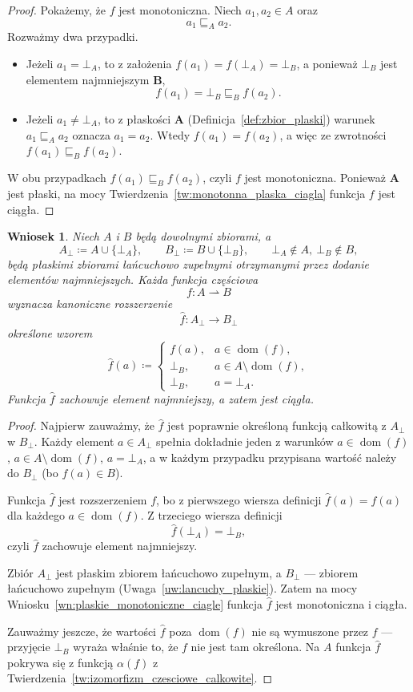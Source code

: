 \documentclass[11pt,a4paper]{article}
\theoremstyle{definition}
\theoremstyle{plain}
\newtheorem{wniosek}[definicja]{Wniosek}
\newcommand{\bt}{\bot}                            %
\newcommand{\dom}{\operatorname{dom}}
\begin{document}
\begin{proof}
	Pokażemy, że $f$ jest monotoniczna. Niech $a_1,a_2\in A$ oraz
	\[
	a_1\sqsubseteq_A a_2.
	\]
	Rozważmy dwa przypadki.
	\begin{itemize}
		\item Jeżeli $a_1=\bt_A$, to z założenia $f(a_1)=f(\bt_A)=\bt_B$,
		a ponieważ $\bt_B$ jest elementem najmniejszym $\boldsymbol{B}$,
		\[
		f(a_1)=\bt_B\sqsubseteq_B f(a_2).
		\]
		\item Jeżeli $a_1\neq\bt_A$, to z płaskości $\boldsymbol{A}$
		(Definicja~\ref{def:zbior_plaski}) warunek $a_1\sqsubseteq_A a_2$
		oznacza $a_1=a_2$. Wtedy $f(a_1)=f(a_2)$, a więc ze zwrotności
		$f(a_1)\sqsubseteq_B f(a_2)$.
	\end{itemize}
	W obu przypadkach $f(a_1)\sqsubseteq_B f(a_2)$, czyli $f$ jest
	monotoniczna. Ponieważ $\boldsymbol{A}$ jest płaski, na mocy
	Twierdzenia~\ref{tw:monotonna_plaska_ciagla} funkcja $f$ jest ciągła.
\end{proof}

\begin{wniosek}\label{wn:funkcje_czesciowe_jako_ciagle}
	Niech $A$ i $B$ będą dowolnymi zbiorami, a
	\[
	A_\bt\coloneqq A\cup\{\bt_A\},
	\qquad
	B_\bt\coloneqq B\cup\{\bt_B\},
	\qquad
	\bt_A\notin A,\ \bt_B\notin B,
	\]
	będą płaskimi zbiorami łańcuchowo zupełnymi otrzymanymi przez dodanie
	elementów najmniejszych. Każda funkcja częściowa
	\[
	f:A\rightharpoonup B
	\]
	wyznacza \emph{kanoniczne rozszerzenie}
	\[
	\widehat{f}:A_\bt\to B_\bt
	\]
	określone wzorem
	\[
	\widehat{f}(a)\coloneqq 
	\begin{cases}
		f(a),&a\in\dom(f),\\
		\bt_B,&a\in A\setminus\dom(f),\\
		\bt_B,&a=\bt_A.
	\end{cases}
	\]
	Funkcja $\widehat{f}$ zachowuje element najmniejszy, a zatem jest
	ciągła.
\end{wniosek}

\begin{proof}
	Najpierw zauważmy, że $\widehat{f}$ jest poprawnie określoną funkcją
	całkowitą z $A_\bt$ w $B_\bt$. Każdy element $a\in A_\bt$ spełnia
	dokładnie jeden z warunków $a\in\dom(f)$, $a\in A\setminus\dom(f)$,
	$a=\bt_A$, a w każdym przypadku przypisana wartość należy do
	$B_\bt$ (bo $f(a)\in B$).
	
	Funkcja $\widehat{f}$ jest rozszerzeniem $f$, bo z pierwszego wiersza
	definicji $\widehat{f}(a)=f(a)$ dla każdego $a\in\dom(f)$. Z trzeciego
	wiersza definicji
	\[
	\widehat{f}(\bt_A)=\bt_B,
	\]
	czyli $\widehat{f}$ zachowuje element najmniejszy.
	
	Zbiór $A_\bt$ jest płaskim zbiorem łańcuchowo zupełnym, a $B_\bt$ ---
	zbiorem łańcuchowo zupełnym (Uwaga~\ref{uw:lancuchy_plaskie}). Zatem
	na mocy Wniosku~\ref{wn:plaskie_monotoniczne_ciagle} funkcja
	$\widehat{f}$ jest monotoniczna i ciągła.
	
	Zauważmy jeszcze, że wartości $\widehat{f}$ poza $\dom(f)$ nie są
	wymuszone przez $f$ --- przyjęcie $\bt_B$ wyraża właśnie to, że $f$
	nie jest tam określona. Na $A$ funkcja $\widehat{f}$ pokrywa się
	z funkcją $\alpha(f)$ z Twierdzenia~\ref{tw:izomorfizm_czesciowe_calkowite}.
\end{proof}
\end{document}
